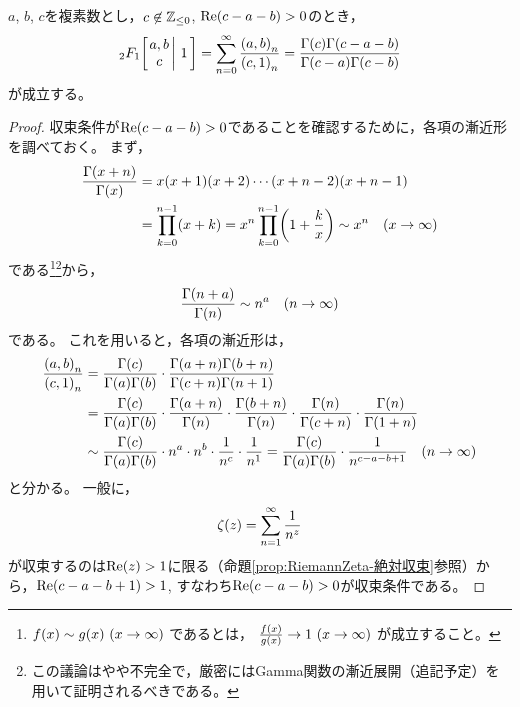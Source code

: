\documentclass[a4paper,draft]{ltjsarticle}
\begin{document}
\begin{thm}[Kummerの関係]
    $a$, $b$, $c$を複素数とし，$c\not\in\mathbb{Z}_{\leq 0}$, $\re{c-a-b}>0$のとき，
    \begin{equation}
        \Gauss{a}{b}{c}{1}
        =\sum_{n=0}^\infty \frac{\poch{a,b}{n}}{\poch{c,1}{n}}
        =\frac{\fun{\Gamma}{c}\fun{\Gamma}{c-a-b}}{\fun{\Gamma}{c-a}\fun{\Gamma}{c-b}}
    \end{equation}
    が成立する。

    \begin{proof}
        収束条件が$\re{c-a-b}>0$であることを確認するために，各項の漸近形を調べておく。
        まず，
        \begin{align}
            \frac{\fun{\Gamma}{x+n}}{\fun{\Gamma}{x}}
            &=x\pare{x+1}\pare{x+2}\cdots \pare{x+n-2}\pare{x+n-1}
            \\
            &=\prod_{k=0}^{n-1}\pare{x+k}
            =x^n\prod_{k=0}^{n-1}\pare{1+\frac{k}{x}}
            \sim x^n\quad \pare{x\to \infty}
        \end{align}
        である\footnote{
            $\fun{f}{x}\sim \fun{g}{x}\ \pare{x\to\infty}$
            であるとは，
            $\frac{\fun{f}{x}}{\fun{g}{x}}\rightarrow 1\ \pare{x\to \infty}$
            が成立すること。
        }\footnote{この議論はやや不完全で，厳密にはGamma関数の漸近展開（追記予定）を用いて証明されるべきである。}から，
        \begin{equation}
            \frac{\fun{\Gamma}{n+a}}{\fun{\Gamma}{n}}\sim n^a\quad\pare{n\to\infty}
        \end{equation}
        である。
        これを用いると，各項の漸近形は，
        \begin{align}
            \frac{\poch{a,b}{n}}{\poch{c,1}{n}}
            &=\frac{\fun{\Gamma}{c}}{\fun{\Gamma}{a}\fun{\Gamma}{b}}\cdot \frac{\fun{\Gamma}{a+n}\fun{\Gamma}{b+n}}{\fun{\Gamma}{c+n}\fun{\Gamma}{n+1}}
            \\
            &=\frac{\fun{\Gamma}{c}}{\fun{\Gamma}{a}\fun{\Gamma}{b}}
            \cdot \frac{\fun{\Gamma}{a+n}}{\fun{\Gamma}{n}}
            \cdot \frac{\fun{\Gamma}{b+n}}{\fun{\Gamma}{n}}
            \cdot \frac{\fun{\Gamma}{n}}{\fun{\Gamma}{c+n}}
            \cdot \frac{\fun{\Gamma}{n}}{\fun{\Gamma}{1+n}}
            \\
            &\sim \frac{\fun{\Gamma}{c}}{\fun{\Gamma}{a}\fun{\Gamma}{b}}
            \cdot n^a\cdot n^b \cdot \frac{1}{n^c}\cdot \frac{1}{n^1}=\frac{\fun{\Gamma}{c}}{\fun{\Gamma}{a}\fun{\Gamma}{b}}\cdot \frac{1}{n^{c-a-b+1}}\quad \pare{n\to\infty}
            \label{eq:gauss-(a,b)_n/(c,1)_nの漸近形}
        \end{align}
        と分かる。
        一般に，
        \begin{equation}
            \fun{\zeta}{z}=\sum_{n=1}^\infty \frac{1}{n^z}
        \end{equation}
        が収束するのは$\re{z}>1$に限る（命題\ref{prop:RiemannZeta-絶対収束}参照）から，$\re{c-a-b+1}>1$, すなわち$\re{c-a-b}>0$が収束条件である。


\end{proof}
\end{thm}
\end{document}
